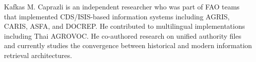 \documentclass[manuscript,screen,nonacm]{acmart}
\begin{document}



\begin{acks}
Kafkas M. Caprazli is an independent researcher who was part of FAO teams that implemented CDS/ISIS-based information systems including AGRIS, CARIS, ASFA, and DOCREP. He contributed to multilingual implementations including Thai AGROVOC. He co-authored research on unified authority files \cite{caprazli2003} and currently studies the convergence between historical and modern information retrieval architectures.
\end{acks}
\end{document}
